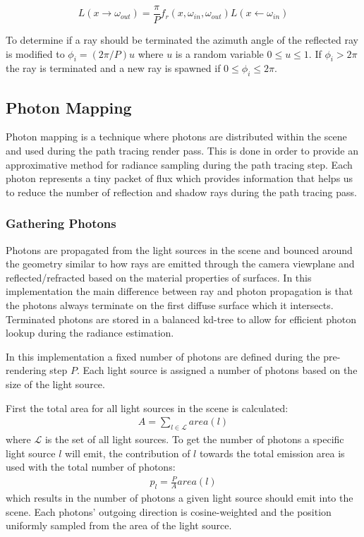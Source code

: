 \documentclass[a4paper, twocolumn]{article}
\begin{document}
          \begin{equation*}
            L(x \rightarrow \omega_{out}) = \frac{\pi}{P} f_r(x, \omega_{in}, \omega_{out}) L(x \leftarrow \omega_{in})
          \end{equation*}

          To determine if a ray should be terminated the azimuth angle of the reflected ray is modified to $\phi_i = (2\pi/P)u$ where $u$ is a random variable $0 \leq u \leq 1$. If $\phi_i > 2\pi$ the ray is terminated and a new ray is spawned if $0 \leq \phi_i \leq 2\pi$.

        \subsection{Photon Mapping} \label{sec:photon_mapping}

        Photon mapping is a technique where photons are distributed within the scene and used during the path tracing render pass. This is done in order to provide an approximative method for radiance sampling during the path tracing step. Each photon represents a tiny packet of flux which provides information that helps us to reduce the number of reflection and shadow rays during the path tracing pass. 

            \subsubsection{Gathering Photons} \label{sec:gathering_photons}

            Photons are propagated from the light sources in the scene and bounced around the geometry similar to how rays are emitted through the camera viewplane and reflected/refracted based on the material properties of surfaces. In this implementation the main difference between ray and photon propagation is that the photons always terminate on the first diffuse surface which it intersects. Terminated photons are stored in a balanced kd-tree to allow for efficient photon lookup during the radiance estimation. 

            In this implementation a fixed number of photons are defined during the pre-rendering step \(P\). Each light source is assigned a number of photons based on the size of the light source.

            First the total area for all light sources in the scene is calculated: 
            \begin{align*}
            A = \sum_{l \in \mathcal{L}}{area(l)}
            \end{align*}
            where \(\mathcal{L}\) is the set of all light sources. To get the number of photons a specific light source \(l\) will emit, the contribution of \(l\) towards the total emission area is used with the total number of photons:
            \begin{align*}
            p_l = \frac{P}{A}area(l)
            \end{align*}
            which results in the number of photons a given light source should emit into the scene. Each photons' outgoing direction is cosine-weighted and the position uniformly sampled from the area of the light source. 
\end{document}

